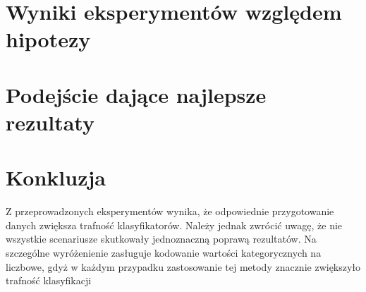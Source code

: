 \documentclass{book}
\begin{document}
\section{Wyniki eksperymentów względem hipotezy}

\section{Podejście dające najlepsze rezultaty}

\section{Konkluzja}

Z przeprowadzonych eksperymentów wynika, 
że odpowiednie przygotowanie danych zwiększa trafność 
klasyfikatorów. Należy jednak zwrócić uwagę, że nie wszystkie 
scenariusze skutkowały jednoznaczną poprawą rezultatów. 
Na szczególne wyróżenienie zasługuje kodowanie wartości 
kategorycznych na liczbowe, gdyż w każdym przypadku zastosowanie 
tej metody znacznie zwiększyło trafność klasyfikacji
\end{document}
